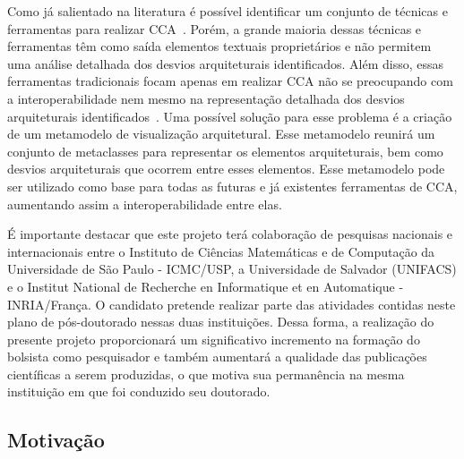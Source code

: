 \documentclass[12pt]{article}
\begin{document}
Como já salientado na literatura é possível identificar um conjunto de técnicas e ferramentas para realizar CCA~\cite{Maffort_2013, Knodel_2007, ArchJava_2202, Murphy_1995}. Porém, a grande maioria dessas técnicas e ferramentas têm como saída elementos textuais proprietários e não permitem uma análise detalhada dos desvios arquiteturais identificados. Além disso, essas ferramentas tradicionais focam apenas em realizar CCA não se preocupando com a interoperabilidade nem mesmo na representação detalhada dos desvios arquiteturais identificados~\cite{Diehl_2007, Gallagher_2008}. Uma possível solução para esse problema é a criação de um metamodelo de visualização arquitetural. Esse metamodelo reunirá um conjunto de metaclasses para representar os elementos arquiteturais, bem como desvios arquiteturais que ocorrem entre esses elementos. Esse metamodelo pode ser utilizado como base para todas as futuras e já existentes ferramentas de CCA, aumentando assim a interoperabilidade entre elas. 

É importante destacar que este projeto terá colaboração de pesquisas nacionais e internacionais entre o Instituto de Ciências Matemáticas e de Computação da Universidade de São Paulo - ICMC/USP, a Universidade de Salvador (UNIFACS) e o Institut National de Recherche en Informatique et en Automatique - INRIA/França. O candidato pretende realizar parte das atividades contidas neste plano de pós-doutorado nessas duas instituições. Dessa forma, a realização do presente projeto proporcionará um significativo incremento na formação do bolsista como pesquisador e também aumentará a qualidade das publicações científicas a serem produzidas, o que motiva sua permanência na mesma instituição em que foi conduzido seu doutorado.


\subsection{Motivação}

\end{document}
